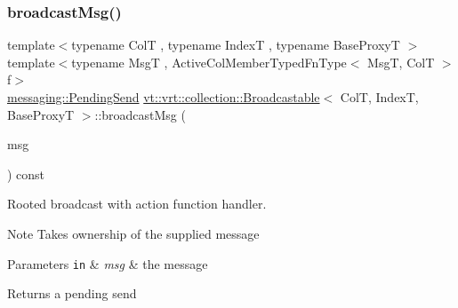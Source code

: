 \subsubsection{\texorpdfstring{broadcast\+Msg()}{broadcastMsg()}\hspace{0.1cm}{\footnotesize\ttfamily [1/3]}}
{\footnotesize\ttfamily template$<$typename ColT , typename IndexT , typename Base\+ProxyT $>$ \\
template$<$typename MsgT , Active\+Col\+Member\+Typed\+Fn\+Type$<$ Msg\+T, Col\+T $>$ f$>$ \\
\hyperlink{structvt_1_1messaging_1_1_pending_send}{messaging\+::\+Pending\+Send} \hyperlink{structvt_1_1vrt_1_1collection_1_1_broadcastable}{vt\+::vrt\+::collection\+::\+Broadcastable}$<$ ColT, IndexT, Base\+ProxyT $>$\+::broadcast\+Msg (\begin{DoxyParamCaption}\item[{\hyperlink{structvt_1_1messaging_1_1_msg_ptr_thief}{messaging\+::\+Msg\+Ptr\+Thief}$<$ MsgT $>$}]{msg }\end{DoxyParamCaption}) const}



Rooted broadcast with action function handler. 

\begin{DoxyNote}{Note}
Takes ownership of the supplied message
\end{DoxyNote}

\begin{DoxyParams}[1]{Parameters}
\mbox{\tt in}  & {\em msg} & the message\\
\hline
\end{DoxyParams}
\begin{DoxyReturn}{Returns}
a pending send 
\end{DoxyReturn}
\mbox{\label{structvt_1_1vrt_1_1collection_1_1_broadcastable_a520d37e5da6ce89657f6d33162a23003}} 
